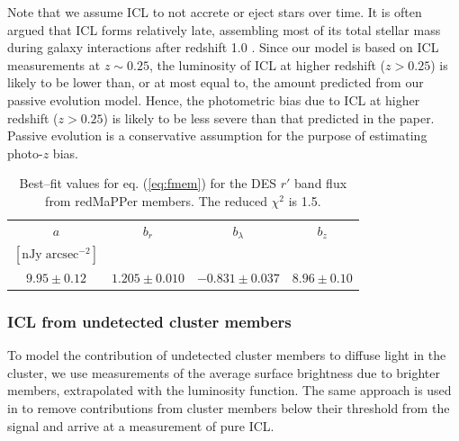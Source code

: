 {%

Note that we assume ICL to not accrete or eject stars over time. It is often argued that ICL forms relatively late, assembling most of its total stellar mass during galaxy interactions after redshift 1.0 \citep{2006ApJ...652L..89M, 2007ApJ...668..826C, 2012MNRAS.425.2058B, 2013ApJ...770...57B, 2014MNRAS.437.3787C, zhangbcg}. Since our model is based on ICL measurements at $z\sim 0.25$, the luminosity of ICL at higher redshift ($z>0.25$) is likely to be lower than, or at most equal to, the amount predicted from our passive evolution model. Hence, the photometric bias due to ICL at higher redshift ($z>0.25$) is likely to be less severe than that predicted in the paper. Passive evolution is a conservative assumption for the purpose of estimating photo-$z$ bias.

\begin{table}
\centering
\begin{tabular}{cccc}
$a$ & $b_r$ & $b_\lambda$&$b_z$\\
$[\mathrm{nJy}\; \mathrm{arcsec}^{-2}]$ & & & \\
\hline
$ 9.95 \pm 0.12 $ & $ 1.205 \pm 0.010 $ & $-0.831 \pm 0.037$ & $8.96 \pm 0.10$

\end{tabular}\caption{Best--fit values for eq. (\ref{eq:fmem}) for the DES $r'$ band flux from redMaPPer members. The reduced $\chi^2$ is 1.5.}\label{tab:fmem}
\end{table}

\subsubsection{ICL from undetected cluster members}

To model the contribution of undetected cluster members to diffuse light in the cluster, we use measurements of the average surface brightness due to brighter members, extrapolated with the luminosity function. The same approach is used in \citet{icl} to remove contributions from cluster members below their threshold from the signal and arrive at a measurement of pure ICL.

}
